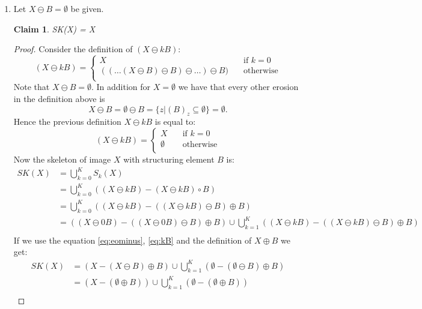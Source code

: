 \documentclass[a4paper]{article}
\newtheorem*{claim}{Claim}
\begin{document}
\begin{enumerate}
\item 
Let $X \ominus B = \emptyset$ be given.
\begin{claim}
    SK(X) = X
\end{claim}
\begin{proof}
Consider the definition of $(X \ominus kB)$:
\[
    (X \ominus kB) =
         \begin{cases}
             X      & \quad \text{if } k = 0\\
             ((\dots(X \ominus B) \ominus B) \ominus \dots) \ominus B) & \quad \text{otherwise} \\
         \end{cases}
\]
Note that $X \ominus B = \emptyset$. In addition for $X = \emptyset$ we have that every other erosion in the definition above is
\begin{equation} \label{eq:eominus}
    X \ominus B = \emptyset \ominus B = \{z | (B)_{z} \subseteq \emptyset\} = \emptyset.
\end{equation}
Hence the previous definition $X \ominus kB$ is equal to:
\begin{equation} \label{eq:kB}
    (X \ominus kB) =
         \begin{cases}
             X      & \quad \text{if } k = 0\\
             \emptyset & \quad \text{otherwise} \\
         \end{cases}
\end{equation}
Now the skeleton of image $X$ with structuring element $B$ is:
\begin{align*}
    SK(X) &= \bigcup_{k = 0}^K S_{k}(X) \\
          &= \bigcup_{k = 0}^K \left((X\ominus kB) - (X \ominus kB) \circ B\right) \\
          &= \bigcup_{k = 0}^K \left((X \ominus kB) - ((X \ominus kB) \ominus B) \oplus B\right) \\
          &= \left((X \ominus 0B) - ((X \ominus 0B) \ominus B) \oplus B\right) \cup \bigcup_{k = 1}^K \left((X \ominus kB) - ((X \ominus kB) \ominus B) \oplus B\right) \\
\end{align*}
If we use the equation \ref{eq:eominus}, \ref{eq:kB} and the definition of $X \oplus B$ we get:
\begin{align*}
    SK(X) &= \left(X - (X \ominus B) \oplus B\right) \cup \bigcup_{k = 1}^K \left(\emptyset - (\emptyset \ominus B) \oplus B\right) \\
          &= \left(X - (\emptyset \oplus B)\right) \cup \bigcup_{k = 1}^K \left(\emptyset - (\emptyset \oplus B)\right) \\

\end{align*}
\end{proof}
\end{enumerate}
\end{document}
